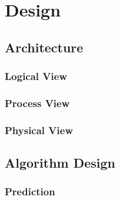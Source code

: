 
\chapter{Design}
\minitoc

\clearpage

\section{Architecture}

\subsection{Logical View}

\subsection{Process View}

\subsection{Physical View}

\section{Algorithm Design}

\subsection{Prediction}\label{algorithm-design:prediction}
